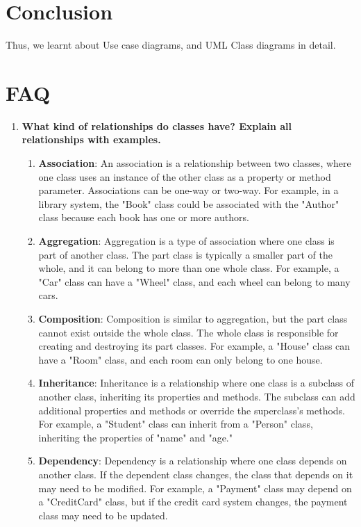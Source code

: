 \documentclass[11pt]{article}
\begin{document}
\section{Conclusion}
Thus, we learnt about Use case diagrams, and UML Class diagrams in detail.
\clearpage

\section{FAQ}


\begin{enumerate}
	\item \textbf{What kind of relationships do classes have? Explain all relationships with examples.}\\
	      \begin{enumerate}
		      \item \textbf{Association}: An association is a relationship between two classes, where one class uses an instance of the other class as a property or method parameter. Associations can be one-way or two-way. For example, in a library system, the "Book" class could be associated with the "Author" class because each book has one or more authors.

		      \item \textbf{Aggregation}: Aggregation is a type of association where one class is part of another class. The part class is typically a smaller part of the whole, and it can belong to more than one whole class. For example, a "Car" class can have a "Wheel" class, and each wheel can belong to many cars.

		      \item \textbf{Composition}: Composition is similar to aggregation, but the part class cannot exist outside the whole class. The whole class is responsible for creating and destroying its part classes. For example, a "House" class can have a "Room" class, and each room can only belong to one house.

		      \item \textbf{Inheritance}: Inheritance is a relationship where one class is a subclass of another class, inheriting its properties and methods. The subclass can add additional properties and methods or override the superclass's methods. For example, a "Student" class can inherit from a "Person" class, inheriting the properties of "name" and "age."

		      \item \textbf{Dependency}: Dependency is a relationship where one class depends on another class. If the dependent class changes, the class that depends on it may need to be modified. For example, a "Payment" class may depend on a "CreditCard" class, but if the credit card system changes, the payment class may need to be updated.
	      \end{enumerate}


\end{enumerate}
\end{document}
